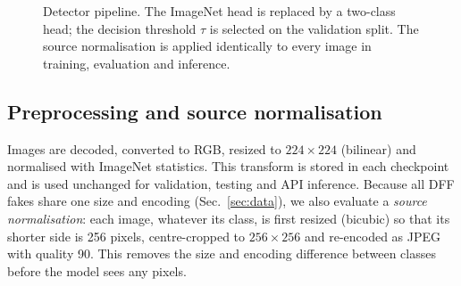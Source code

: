\documentclass[conference]{IEEEtran}
\begin{document}
\begin{figure}[!t]
\centering
{}
\caption{Detector pipeline. The ImageNet head is replaced by a two-class head; the decision threshold $\tau$ is selected on the validation split. The source normalisation is applied identically to every image in training, evaluation and inference.}
\label{fig:detector}
\end{figure}

\subsection{Preprocessing and source normalisation}
Images are decoded, converted to RGB, resized to $224\times224$ (bilinear) and normalised with ImageNet statistics. This transform is stored in each checkpoint and is used unchanged for validation, testing and API inference. Because all DFF fakes share one size and encoding (Sec.~\ref{sec:data}), we also evaluate a \emph{source normalisation}: each image, whatever its class, is first resized (bicubic) so that its shorter side is 256 pixels, centre-cropped to $256\times256$ and re-encoded as JPEG with quality 90. This removes the size and encoding difference between classes before the model sees any pixels.
\end{document}
